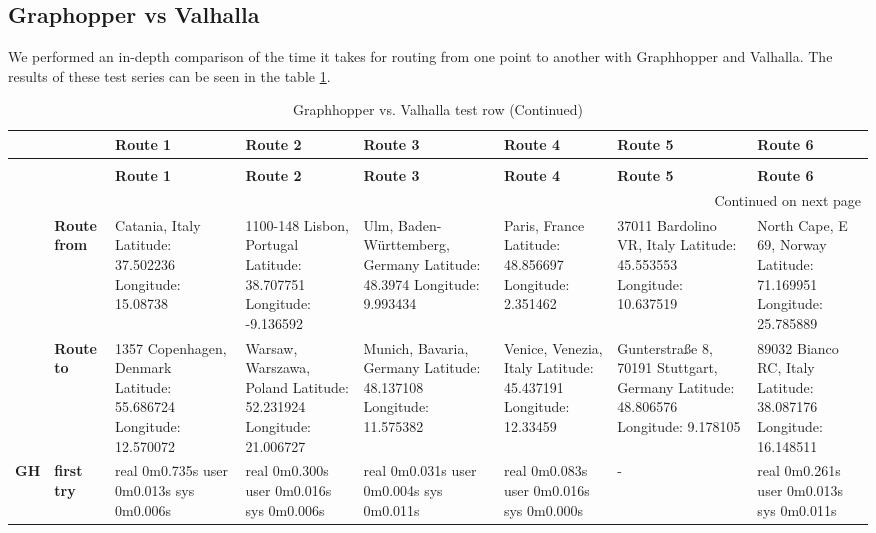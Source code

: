 \subsection{Graphopper vs Valhalla}
We performed an in-depth comparison of the time it takes for routing from one point to another with Graphhopper and Valhalla. The results of these test series can be seen in the table \ref{GHvsVH}.
%
\begin{longtable}{|p{0.5cm}|p{1.0cm}|p{2.0cm}|p{2.0cm}|p{2.0cm}|p{2.0cm}|p{2.0cm}|p{2.0cm}|}
\caption{Graphhopper vs. Valhalla test row \label{GHvsVH}}\\ \hline
                                       &                           & \textbf{Route 1} & \textbf{Route 2} & \textbf{Route 3} & \textbf{Route 4} & \textbf{Route 5} & \textbf{Route 6}  \\ \hline
\endfirsthead
\caption{Graphhopper vs. Valhalla test row (Continued)} \\ \hline
                                       &                           & \textbf{Route 1} & \textbf{Route 2} & \textbf{Route 3} & \textbf{Route 4} & \textbf{Route 5} & \textbf{Route 6}  \\ \hline
\endhead
\multicolumn{8}{|r|}{Continued on next page}\\ \hline
\endfoot
\hline
\endlastfoot
                                       & \textbf{Route from}       & Catania, Italy Latitude: 37.502236 Longitude: 15.08738 & 1100-148 Lisbon, Portugal Latitude: 38.707751 Longitude: -9.136592 & Ulm, Baden-Württemberg, Germany Latitude: 48.3974 Longitude: 9.993434 & Paris, France Latitude: 48.856697 Longitude: 2.351462 & 37011 Bardolino VR, Italy Latitude: 45.553553 Longitude: 10.637519 & North Cape, E 69, Norway Latitude: 71.169951 Longitude: 25.785889 \\ \hline
                                       & \textbf{Route to}         &  1357 Copenhagen, Denmark Latitude: 55.686724 Longitude: 12.570072 & Warsaw, Warszawa, Poland Latitude: 52.231924 Longitude: 21.006727 & Munich, Bavaria, Germany Latitude: 48.137108 Longitude: 11.575382 & Venice, Venezia, Italy Latitude: 45.437191 Longitude: 12.33459 & Gunterstraße 8, 70191 Stuttgart, Germany Latitude: 48.806576 Longitude: 9.178105 & 89032 Bianco RC, Italy Latitude: 38.087176 Longitude: 16.148511 \\ \hline
\multirow{3}{*}{\textbf{GH}} & \textbf{first try}        & real 0m0.735s user 0m0.013s sys 0m0.006s & real 0m0.300s user 0m0.016s sys 0m0.006s & real 0m0.031s user 0m0.004s sys 0m0.011s & real 0m0.083s user 0m0.016s sys 0m0.000s & - & real 0m0.261s user 0m0.013s sys 0m0.011s \\ \hline

\end{longtable}
